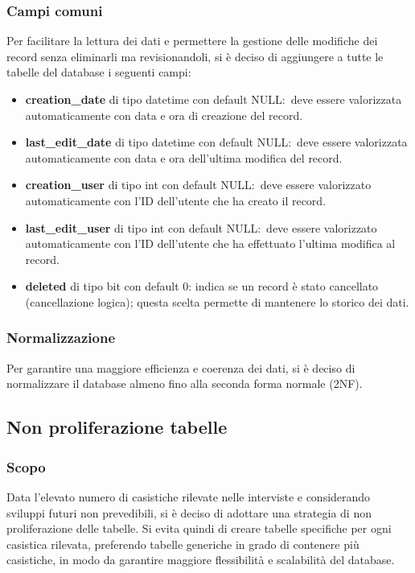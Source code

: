 \documentclass[12pt, a4paper]{article}
\begin{document}
\subsubsection{Campi comuni}
Per facilitare la lettura dei dati e permettere la gestione delle modifiche dei record senza eliminarli ma revisionandoli, si è deciso di aggiungere a tutte le tabelle del database
i seguenti campi:
\begin{itemize}
    \item \textbf{creation\_date} di tipo datetime con default NULL:\ deve essere valorizzata automaticamente con data e ora di creazione del record.
    \item \textbf{last\_edit\_date} di tipo datetime con default NULL:\ deve essere valorizzata automaticamente con data e ora dell'ultima modifica del record.
    \item \textbf{creation\_user} di tipo int con default NULL:\ deve essere valorizzato automaticamente con l'ID dell'utente che ha creato il record.
    \item \textbf{last\_edit\_user} di tipo int con default NULL:\ deve essere valorizzato automaticamente con l'ID dell'utente che ha effettuato l'ultima modifica al record.
    \item \textbf{deleted} di tipo bit con default 0: indica se un record è stato cancellato (cancellazione logica); questa scelta permette di mantenere lo storico dei dati.
\end{itemize}

\subsubsection{Normalizzazione}
Per garantire una maggiore efficienza e coerenza dei dati, si è deciso di normalizzare il database almeno fino alla seconda forma normale (2NF).

\subsection{Non proliferazione tabelle}
\subsubsection{Scopo}
Data l'elevato numero di casistiche rilevate nelle interviste e considerando sviluppi futuri non prevedibili, si è deciso di adottare una strategia di non proliferazione delle tabelle.
Si evita quindi di creare tabelle specifiche per ogni casistica rilevata, preferendo tabelle generiche in grado di contenere più casistiche, in modo da garantire maggiore flessibilità e scalabilità del database.
\end{document}
